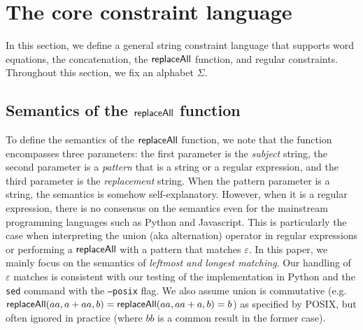 
\section{The core constraint language}\label{sec-core}

In this section, we define a general string constraint language that supports word equations, the concatenation, the $\mathsf{replaceAll}$ function, and regular constraints.  Throughout this section, we fix an alphabet $\Sigma$.



\subsection{Semantics of the $\mathsf{replaceAll}$ function}
To define the semantics of the $\mathsf{replaceAll}$ function, we note that the function encompasses three parameters: the first parameter is the \emph{subject} string, the second parameter is a \emph{pattern} that is a string or a regular expression, and the third parameter is the \emph{replacement} string. When the pattern parameter is a string, the semantics is somehow self-explanatory. However, when it is a regular expression, there is no consensus on the semantics even for the mainstream programming languages such as Python and Javascript.
 This is particularly the case when interpreting the union (aka alternation) operator in regular expressions or performing a $\mathsf{replaceAll}$ with a pattern that matches $\varepsilon$. In this paper, we mainly 
 focus on the semantics of \emph{leftmost and longest matching}.
Our handling of $\varepsilon$ matches is consistent with our testing of the implementation in Python and the \texttt{sed} command with the \texttt{--posix} flag.
We also assume union is commutative (e.g.\ $\mathsf{replaceAll}(aa, a + aa, b) = \mathsf{replaceAll}(aa, aa + a, b) = b$) as specified by POSIX, but often ignored in practice (where $bb$ is a common result in the former case).


